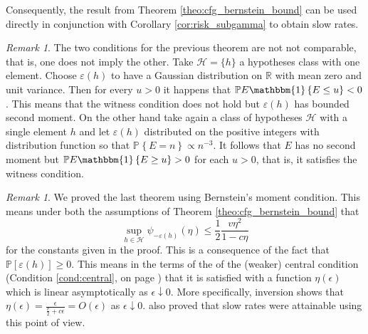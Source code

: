 \documentclass{uvamath}
\newcommand*{\reals}{\mathbb{R}}
\newcommand*{\calH}{\mathcal{H}}
\newcommand*{\bbP}{\mathbb{P}}
\newcommand*{\prob}[2][]{\mathbb{P}_{#1}\left\{#2\right\}}
\newcommand*{\indicator}[1]{\mathbbm{1}\left\{#1\right\}}
\theoremstyle{remark}
\newtheorem{remark}[theorem]{Remark}
\theoremstyle{definition}
\theoremstyle{definition}
\theoremstyle{definition}
\theoremstyle{definition}
\theoremstyle{definition}
\begin{document}
Consequently, the result from Theorem \ref{theo:cfg_bernstein_bound}
can be used directly in conjunction with Corollary
\ref{cor:risk_subgamma} to obtain slow rates.

\begin{remark}
  The two conditions for the previous theorem are not not comparable,
  that is, one does not imply the other. Take $\calH = \{h\}$ a
  hypotheses class with one element. Choose $\varepsilon(h)$ to have a
  Gaussian distribution on $\reals$ with mean zero and unit
  variance. Then for every $u>0$ it happens that
  $\bbP E\indicator{E\leq u}< 0$. This means that the witness
  condition does not hold but $\varepsilon(h)$ has bounded second
  moment. On the other hand take again a class of hypotheses $\calH$
  with a single element $h$ and let $\varepsilon(h)$ distributed on
  the positive integers with distribution function so that
  $\prob{E = n}\propto n^{-3}$. It follows that $E$ has no second
  moment but $\bbP E\indicator{E\geq u}>0$ for each $u>0$, that is, it
  satisfies the witness condition.
\end{remark}

\begin{remark}
  We proved the last theorem using Bernstein's moment condition. This
  means under both the assumptions of Theorem
  \ref{theo:cfg_bernstein_bound} that
  \begin{equation*}
    \sup_{h\in\calH}\psi_{-\varepsilon(h)}(\eta)\leq \frac{1}{2}\frac{v\eta^2}{1-c\eta}
  \end{equation*}
  for the constants given in the proof. This is a consequence of the
  fact that $\bbP[\varepsilon(h)]\geq 0$. This means in the terms of
  the of the (weaker) central condition (Condition \ref{cond:central},
  on page \pageref{cond:central}) that it is satisfied with a function
  $\eta(\epsilon)$ which is linear asymptotically as
  $\epsilon\downarrow 0$. More specifically, inversion shows that
  $\eta(\epsilon) = \frac{\epsilon}{\frac{v}{2} + c\epsilon } =
  O(\epsilon)$
  as $\epsilon\downarrow 0$. \citet{grunwald_fast_2016} also proved
  that slow rates were attainable using this point of view.
\end{remark}





\end{document}
